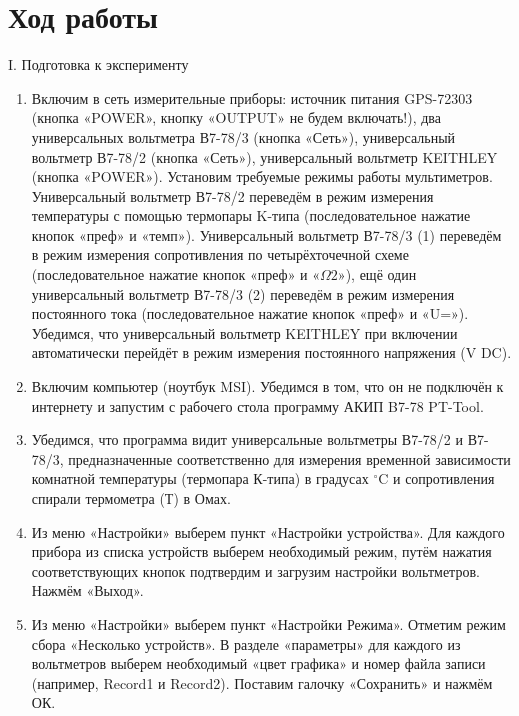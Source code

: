 \documentclass[a4paper,12pt]{article} %
\begin{document}
\section*{Ход работы}

\begin{center}
  \textsf{I. Подготовка к эксперименту}
\end{center}

\begin{enumerate}
    \item Включим в сеть измерительные приборы: источник питания GPS-72303 (кнопка «POWER», кнопку «OUTPUT» не будем включать!), два универсальных вольтметра В7-78/3 (кнопка «Сеть»), универсальный вольтметр В7-78/2 (кнопка «Сеть»), универсальный вольтметр KEITHLEY (кнопка «POWER»). Установим требуемые режимы работы мультиметров. Универсальный вольтметр В7-78/2 переведём в режим измерения температуры с помощью термопары K-типа (последовательное нажатие кнопок «преф» и «темп»). Универсальный вольтметр В7-78/3 (1) переведём в режим измерения сопротивления по четырёхточечной схеме (последовательное нажатие кнопок «преф» и «$\Omega2$»), ещё один универсальный вольтметр В7-78/3 (2) переведём в режим измерения постоянного тока (последовательное нажатие кнопок «преф» и «U=»). Убедимся, что универсальный вольтметр KEITHLEY при включении автоматически перейдёт в режим измерения постоянного напряжения (V DC).

    \item Включим компьютер (ноутбук MSI). Убедимся в том, что он не подключён к интернету и запустим с рабочего стола программу АКИП B7-78 PT-Tool.

    \item Убедимся, что программа видит универсальные вольтметры В7-78/2 и В7-78/3, предназначенные соответственно для измерения временной зависимости комнатной температуры (термопара К-типа) в градусах $^\circ$C и сопротивления спирали термометра (Т) в Омах.

    \item Из меню «Настройки» выберем пункт «Настройки устройства». Для каждого прибора из списка устройств выберем необходимый режим, путём нажатия соответствующих кнопок подтвердим и загрузим настройки вольтметров. Нажмём «Выход».

    \item Из меню «Настройки» выберем пункт «Настройки Режима». Отметим режим сбора «Несколько устройств». В разделе «параметры» для каждого из вольтметров выберем необходимый «цвет графика» и номер файла записи (например, Record1 и Record2). Поставим галочку «Сохранить» и нажмём ОК.


\end{enumerate}
\end{document}
